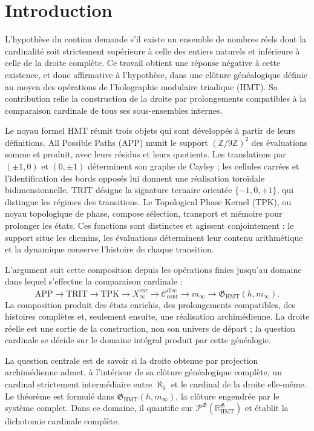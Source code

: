 \section{Introduction}
\label{sec:introduccion-ch}

L'hypothèse du continu demande s'il existe un ensemble de nombres réels dont la cardinalité soit strictement supérieure à celle des entiers naturels et inférieure à celle de la droite complète. Ce travail obtient une réponse négative à cette existence, et donc affirmative à l'hypothèse, dans une clôture généalogique définie au moyen des opérations de l'holographie modulaire triadique (HMT). Sa contribution relie la construction de la droite par prolongements compatibles à la comparaison cardinale de tous ses sous-ensembles internes.

Le noyau formel HMT réunit trois objets qui sont développés à partir de leurs
définitions. All Possible Paths (APP) munit le support
\((\mathbb Z/9\mathbb Z)^2\) des évaluations somme et produit, avec leurs
résidus et leurs quotients. Les translations par \((\pm1,0)\) et \((0,\pm1)\)
déterminent son graphe de Cayley ; les cellules carrées et l’identification des
bords opposés lui donnent une réalisation toroïdale bidimensionnelle. TRIT désigne
la signature ternaire orientée \(\{-1,0,+1\}\), qui distingue les
régimes des transitions. Le Topological Phase Kernel (TPK), ou noyau
topologique de phase, compose sélection, transport et mémoire pour prolonger
les états. Ces fonctions sont distinctes et agissent conjointement : le support
situe les chemins, les évaluations déterminent leur contenu arithmétique et la
dynamique conserve l’histoire de chaque transition.

L’argument suit cette composition depuis les opérations finies jusqu’au
domaine dans lequel s’effectue la comparaison cardinale :
\[
 \mathrm{APP}\longrightarrow\mathrm{TRIT}\longrightarrow\mathrm{TPK}
 \longrightarrow X_\infty^{\mathrm{enr}}
 \longrightarrow\mathcal C_{\mathrm{cont}}^{\mathrm{disc}}
 \longrightarrow m_\infty
 \longrightarrow\mathfrak G_{\mathrm{HMT}}(h,m_\infty).
\]
La composition produit des états enrichis, des prolongements compatibles,
des histoires complètes et, seulement ensuite, une réalisation archimédienne. La droite
réelle est une sortie de la construction, non son univers de départ ; la question
cardinale se décide sur le domaine intégral produit par cette généalogie.

La question centrale est de savoir si la droite obtenue par projection archimédienne admet, à l'intérieur de sa clôture généalogique complète, un cardinal strictement intermédiaire entre \(\aleph_0\) et le cardinal de la droite elle-même. Le théorème est formulé dans \(\mathfrak G_{\mathrm{HMT}}(h,m_\infty)\), la clôture engendrée par le système complet. Dans ce domaine, il quantifie sur \(\mathcal P^{\mathfrak G}(\mathbb R_{\mathrm{HMT}}^{\mathfrak G})\) et établit la dichotomie cardinale complète.

